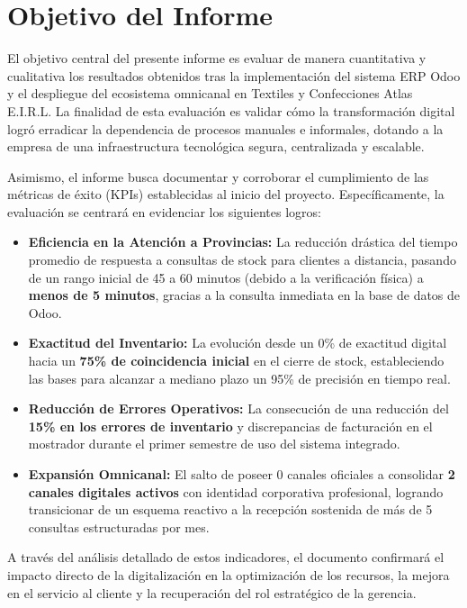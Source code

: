 \section{Objetivo del Informe}

El objetivo central del presente informe es evaluar de manera cuantitativa y cualitativa los resultados obtenidos tras la implementación del sistema ERP Odoo y el despliegue del ecosistema omnicanal en Textiles y Confecciones Atlas E.I.R.L. La finalidad de esta evaluación es validar cómo la transformación digital logró erradicar la dependencia de procesos manuales e informales, dotando a la empresa de una infraestructura tecnológica segura, centralizada y escalable.

Asimismo, el informe busca documentar y corroborar el cumplimiento de las métricas de éxito (KPIs) establecidas al inicio del proyecto. Específicamente, la evaluación se centrará en evidenciar los siguientes logros:

\begin{itemize}
    \item \textbf{Eficiencia en la Atención a Provincias:} La reducción drástica del tiempo promedio de respuesta a consultas de stock para clientes a distancia, pasando de un rango inicial de 45 a 60 minutos (debido a la verificación física) a \textbf{menos de 5 minutos}, gracias a la consulta inmediata en la base de datos de Odoo.
    \item \textbf{Exactitud del Inventario:} La evolución desde un 0\% de exactitud digital hacia un \textbf{75\% de coincidencia inicial} en el cierre de stock, estableciendo las bases para alcanzar a mediano plazo un 95\% de precisión en tiempo real.
    \item \textbf{Reducción de Errores Operativos:} La consecución de una reducción del \textbf{15\% en los errores de inventario} y discrepancias de facturación en el mostrador durante el primer semestre de uso del sistema integrado.
    \item \textbf{Expansión Omnicanal:} El salto de poseer 0 canales oficiales a consolidar \textbf{2 canales digitales activos} con identidad corporativa profesional, logrando transicionar de un esquema reactivo a la recepción sostenida de más de 5 consultas estructuradas por mes.
\end{itemize}

A través del análisis detallado de estos indicadores, el documento confirmará el impacto directo de la digitalización en la optimización de los recursos, la mejora en el servicio al cliente y la recuperación del rol estratégico de la gerencia.
